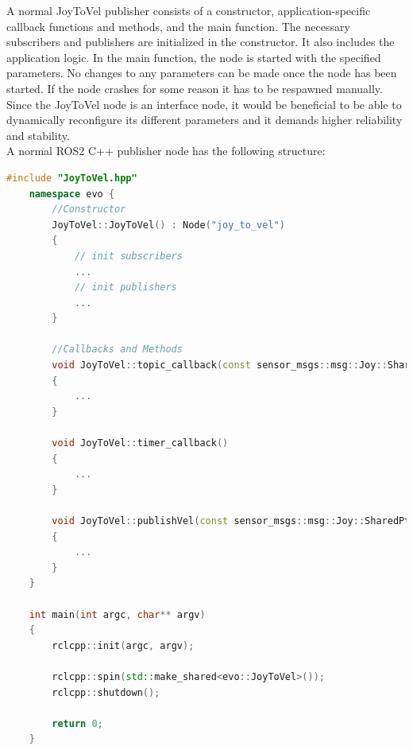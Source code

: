 A normal JoyToVel publisher consists of a constructor, application-specific callback functions and methods, and the main function. The necessary subscribers and publishers are initialized in the constructor. It also includes the application logic. In the main function, the node is started with the specified parameters. No changes to any parameters can be made once the node has been started. If the node crashes for some reason it has to be respawned manually. Since the JoyToVel node is an interface node, it would be beneficial to be able to dynamically reconfigure its different parameters and it demands higher reliability and stability. \\
A normal ROS2 C++ publisher node has the following structure:   
\begin{lstlisting}[language=cpp]
	#include "JoyToVel.hpp"
	namespace evo {
		//Constructor
		JoyToVel::JoyToVel() : Node("joy_to_vel")
		{
			// init subscribers
			...
			// init publishers
			...
		}

		//Callbacks and Methods
		void JoyToVel::topic_callback(const sensor_msgs::msg::Joy::SharedPtr msg) const
		{
			...
		}

		void JoyToVel::timer_callback()
		{  
			...
		}

		void JoyToVel::publishVel(const sensor_msgs::msg::Joy::SharedPtr msg)
		{
			...
		}
	}

	int main(int argc, char** argv)
	{
		rclcpp::init(argc, argv);
  
		rclcpp::spin(std::make_shared<evo::JoyToVel>());
		rclcpp::shutdown();

		return 0;
	}

\end{lstlisting}

